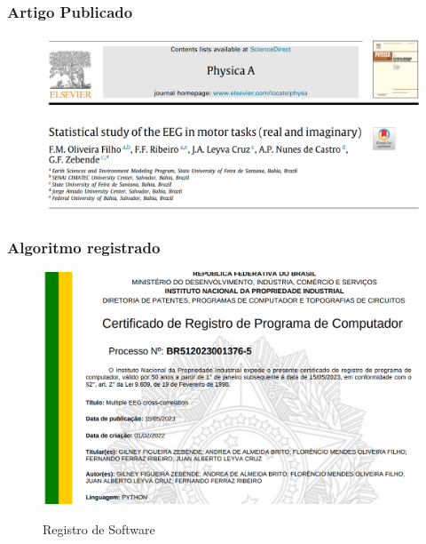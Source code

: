 \documentclass[11pt, aspectratio=169]{beamer}
\begin{document}
\begin{frame}
  \frametitle{Artigo Publicado}

  \begin{figure}[!htb]
    \centering
    \caption{\cite{Oliveira2023}}
    \includegraphics[height=.6\paperheight]{../Figures/artigos_publicados/artigo_01_abr_2023.png}
    \label{fig:ar_pub_01}
  \end{figure}

\end{frame}


  \begin{frame}
    \frametitle{Algoritmo registrado}
  
    \begin{figure}[!htb]
      \centering
      \caption{Registro de Software}
      \includegraphics[height=.6\paperheight]{../Figures/artigos_publicados/certificado_alg_01.png}
      \label{fig:alg_pub_01}
    \end{figure}
  
  \end{frame}
\end{document}
